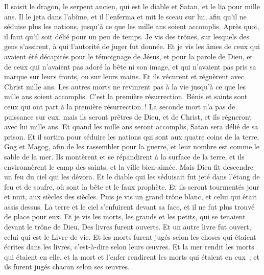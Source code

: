 \begin{multicols}{2}
Il saisit le dragon, le serpent ancien, qui est le diable et Satan, et le lia pour mille ans.
Il le jeta dans l'abîme, et il l'enferma et mit le sceau sur lui, afin qu'il ne séduise plus les nations, jusqu'à ce que les mille ans soient accomplis. Après quoi, il faut qu'il soit délié pour un peu de temps.
Je vis des trônes, sur lesquels des gens s'assirent, à qui l'autorité de juger fut donnée. Et je vis les âmes de ceux qui avaient été décapités pour le témoignage de Jésus, et pour la parole de Dieu, et de ceux qui n'avaient pas adoré la bête ni son image, et qui n'avaient pas pris sa marque sur leurs fronts, ou sur leurs mains. Et ils vécurent et régnèrent avec Christ mille ans.
Les autres morts ne revinrent pas à la vie jusqu'à ce que les mille ans soient accomplis. C'est la première résurrection.
Bénis et saints sont ceux qui ont part à la première résurrection~! La seconde mort n'a pas de puissance sur eux, mais ils seront prêtres de Dieu, et de Christ, et ils régneront avec lui mille ans.
Et quand les mille ans seront accomplis, Satan sera délié de sa prison.
Et il sortira pour séduire les nations qui sont aux quatre coins de la terre, Gog et Magog, afin de les rassembler pour la guerre, et leur nombre est comme le sable de la mer.
Ils montèrent et se répandirent à la surface de la terre, et ils environnèrent le camp des saints, et la ville bien-aimée. Mais Dieu fit descendre un feu du ciel qui les dévora.
Et le diable qui les séduisait fut jeté dans l'étang de feu et de soufre, où sont la bête et le faux prophète. Et ils seront tourmentés jour et nuit, aux siècles des siècles.
Puis je vis un grand trône blanc, et celui qui était assis dessus. La terre et le ciel s'enfuirent devant sa face, et il ne fut plus trouvé de place pour eux.
Et je vis les morts, les grands et les petits, qui se tenaient devant le trône de Dieu. Des livres furent ouverts. Et un autre livre fut ouvert, celui qui est le Livre de vie. Et les morts furent jugés selon les choses qui étaient écrites dans les livres, c'est-à-dire selon leurs œuvres.
Et la mer rendit les morts qui étaient en elle, et la mort et l'enfer rendirent les morts qui étaient en eux~; et ils furent jugés chacun selon ses œuvres.

\end{multicols}
